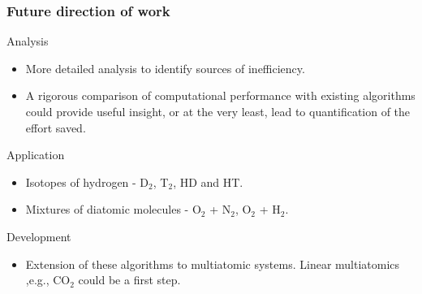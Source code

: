 \documentclass[xcolor=svgnames]{beamer}
\begin{document}
        \begin{frame}
            \frametitle{Future direction of work}
            \begin{block}{Analysis}
                \begin{itemize}
                    \item More detailed analysis to identify sources of inefficiency.
                    \item A rigorous comparison of computational performance with existing algorithms could provide useful insight, or at the very least, lead to quantification of the effort saved.
                \end{itemize}
            \end{block}
            \begin{block}{Application}
                \begin{itemize}
                    \item Isotopes of hydrogen - D$_2$, T$_2$, HD and HT.
                    \item Mixtures of diatomic molecules - O$_2$ + N$_2$, O$_2$ + H$_2$.
                \end{itemize}
            \end{block}
            \begin{block}{Development}
                \begin{itemize}
                    \item Extension of these algorithms to multiatomic systems. Linear multiatomics ,e.g., CO$_2$ could be a first step.
                \end{itemize}
            \end{block}
        \end{frame}
\end{document}
